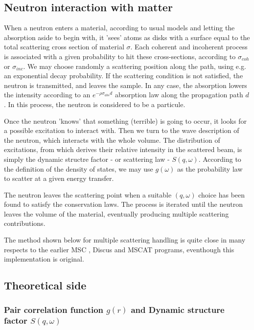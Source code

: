 \subsection{Neutron interaction with matter}

When a neutron enters a material, according to usual models and letting the absorption aside to begin with, it 'sees' atoms as disks with a surface equal to the total scattering cross section of material $\sigma$. Each coherent and incoherent process is associated with a given probability to hit these cross-sections, according to $\sigma_{coh}$ or $\sigma_{inc}$. We may choose randomly a scattering position along the path, using e.g. an exponential decay probability. If the scattering condition is not satisfied, the neutron is transmitted, and leaves the sample. In any case, the absorption lowers the intensity according to an $e^{-\rho \sigma_{abs}d}$ absorption law along the propagation path $d$. In this process, the neutron is considered to be a particule.

Once the neutron 'knows' that something (terrible) is going to occur, it looks for a possible excitation to interact with. Then we turn to the wave description of the neutron, which interacts with the whole volume. The distribution of excitations, from which derives their relative intensity in the scattered beam, is simply the dynamic structre factor - or scattering law - $S(q,\omega)$. According to the definition of the density of states, we may use $g(\omega)$ as the probability law to scatter at a given energy transfer.

The neutron leaves the scattering point when a suitable $(q, \omega)$ choice has been found to satisfy the conservation laws. The process is iterated until the neutron leaves the volume of the material, eventually producing multiple scattering contributions.

The method shown below for multiple scattering handling is quite close in many respects to the earlier MSC \cite{msc}, Discus \cite{discus} and MSCAT \cite{mscat} programs, eventhough this implementation is original.

\subsection{Theoretical side}

\subsubsection{Pair correlation function $g(r)$ and Dynamic structure factor $S(q,\omega)$}

